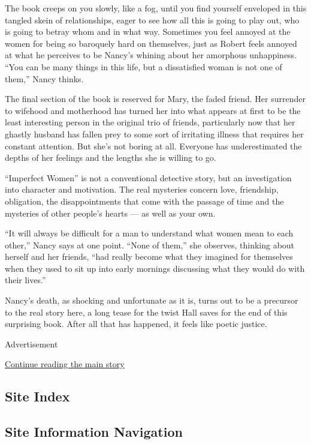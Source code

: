 The book creeps on you slowly, like a fog, until you find yourself
enveloped in this tangled skein of relationships, eager to see how all
this is going to play out, who is going to betray whom and in what way.
Sometimes you feel annoyed at the women for being so baroquely hard on
themselves, just as Robert feels annoyed at what he perceives to be
Nancy's whining about her amorphous unhappiness. ``You can be many
things in this life, but a dissatisfied woman is not one of them,''
Nancy thinks.

The final section of the book is reserved for Mary, the faded friend.
Her surrender to wifehood and motherhood has turned her into what
appears at first to be the least interesting person in the original trio
of friends, particularly now that her ghastly husband has fallen prey to
some sort of irritating illness that requires her constant attention.
But she's not boring at all. Everyone has underestimated the depths of
her feelings and the lengths she is willing to go.

``Imperfect Women'' is not a conventional detective story, but an
investigation into character and motivation. The real mysteries concern
love, friendship, obligation, the disappointments that come with the
passage of time and the mysteries of other people's hearts --- as well
as your own.

``It will always be difficult for a man to understand what women mean to
each other,'' Nancy says at one point. ``None of them,'' she observes,
thinking about herself and her friends, ``had really become what they
imagined for themselves when they used to sit up into early mornings
discussing what they would do with their lives.''

Nancy's death, as shocking and unfortunate as it is, turns out to be a
precursor to the real story here, a long tease for the twist Hall saves
for the end of this surprising book. After all that has happened, it
feels like poetic justice.

Advertisement

\protect\hyperlink{after-bottom}{Continue reading the main story}

\hypertarget{site-index}{%
\subsection{Site Index}\label{site-index}}

\hypertarget{site-information-navigation}{%
\subsection{Site Information
Navigation}\label{site-information-navigation}}

